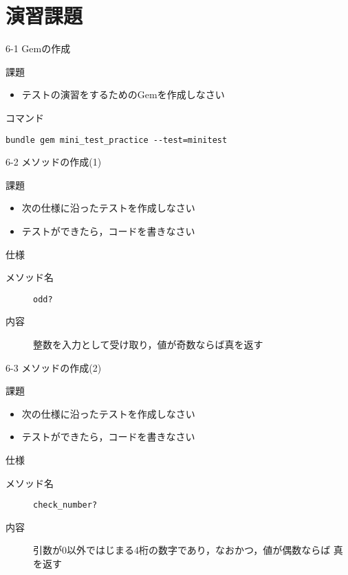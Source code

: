 \documentclass[t, aspectratio=169]{beamer}
\begin{document}
\section{演習課題}
\label{sec-6-4}
\begin{frame}[fragile,label=sec-6-4-1]{6-1 Gemの作成}
 \begin{block}{課題}
\begin{itemize}
\item テストの演習をするためのGemを作成しなさい
\end{itemize}
\end{block}
\begin{block}{コマンド}
\begin{verbatim}
bundle gem mini_test_practice --test=minitest
\end{verbatim}
\end{block}
\end{frame}

\begin{frame}[fragile,label=sec-6-4-2]{6-2 メソッドの作成(1)}
 \begin{block}{課題}
\begin{itemize}
\item 次の仕様に沿ったテストを作成しなさい
\item テストができたら，コードを書きなさい
\end{itemize}
\end{block}
\begin{block}{仕様}
\begin{description}
\item[{メソッド名}] \texttt{odd?}
\item[{内容}] 整数を入力として受け取り，値が奇数ならば真を返す
\end{description}
\end{block}
\end{frame}

\begin{frame}[fragile,label=sec-6-4-3]{6-3 メソッドの作成(2)}
 \begin{block}{課題}
\begin{itemize}
\item 次の仕様に沿ったテストを作成しなさい
\item テストができたら，コードを書きなさい
\end{itemize}
\end{block}
\begin{block}{仕様}
\begin{description}
\item[{メソッド名}] \texttt{check\_number?}
\item[{内容}] 引数が0以外ではじまる4桁の数字であり，なおかつ，値が偶数ならば
真を返す
\end{description}
\end{block}
\end{frame}
\end{document}
